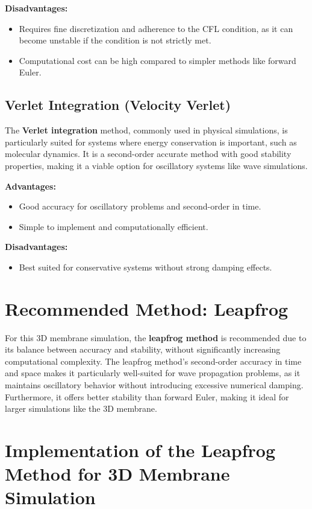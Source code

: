 \documentclass{article}
\begin{document}
\textbf{Disadvantages:}
\begin{itemize}
    \item Requires fine discretization and adherence to the CFL condition, as it can become unstable if the condition is not strictly met.
    \item Computational cost can be high compared to simpler methods like forward Euler.
\end{itemize}

\subsection{Verlet Integration (Velocity Verlet)}

The \textbf{Verlet integration} method, commonly used in physical simulations, is particularly suited for systems where energy conservation is important, such as molecular dynamics. It is a second-order accurate method with good stability properties, making it a viable option for oscillatory systems like wave simulations.

\textbf{Advantages:}
\begin{itemize}
    \item Good accuracy for oscillatory problems and second-order in time.
    \item Simple to implement and computationally efficient.
\end{itemize}

\textbf{Disadvantages:}
\begin{itemize}
    \item Best suited for conservative systems without strong damping effects.
\end{itemize}

\section{Recommended Method: Leapfrog}

For this 3D membrane simulation, the \textbf{leapfrog method} is recommended due to its balance between accuracy and stability, without significantly increasing computational complexity. The leapfrog method’s second-order accuracy in time and space makes it particularly well-suited for wave propagation problems, as it maintains oscillatory behavior without introducing excessive numerical damping. Furthermore, it offers better stability than forward Euler, making it ideal for larger simulations like the 3D membrane.

\section{Implementation of the Leapfrog Method for 3D Membrane Simulation}
\end{document}
